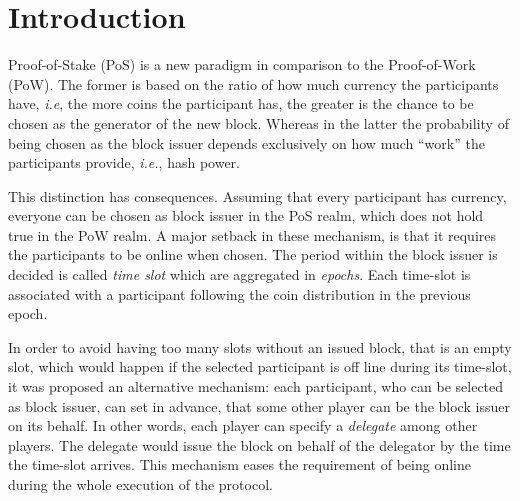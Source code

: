 
\section{Introduction}
Proof-of-Stake (PoS) is a new paradigm in comparison to the Proof-of-Work (PoW). The former is based on the ratio of how much currency the participants have, \textit{i.e}, the more coins the participant has, the greater is the chance to be chosen as the generator of the new block. Whereas in  the latter the probability of being chosen as the block issuer depends exclusively on how much ``work'' the participants provide, \textit{i.e.}, hash power.


This distinction has consequences. Assuming that every participant has currency, everyone can be chosen as block issuer in the PoS realm, which does not hold true in the PoW realm. A major setback in these mechanism, is that it requires the participants to be online when chosen. The period within the block issuer is decided is called \textit{time slot} which are aggregated in \textit{epochs}. Each time-slot is associated with a participant following the coin distribution in the previous epoch.  

In order to avoid having too many slots without an issued block, that is an empty slot, which would happen if the selected participant is off line during its time-slot, it was proposed an alternative mechanism: each participant, who can be selected as block issuer, can set in advance, that some other player can be the block issuer on its behalf. In other words, each player can specify a \textit{delegate} among other players. The delegate would issue the block on behalf of the delegator by the time the time-slot arrives. This mechanism eases the requirement of being online during the whole execution of the protocol.


